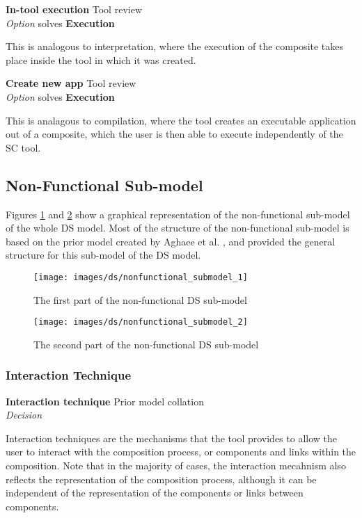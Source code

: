 \textbf{In-tool execution} \hfill Tool review \\ \emph{Option} \hfill solves \textbf{Execution}

This is analogous to interpretation, where the execution of the composite takes place inside the tool in which it was created.

\textbf{Create new app} \hfill Tool review \\ \emph{Option} \hfill solves \textbf{Execution}

This is analagous to compilation, where the tool creates an executable application out of a composite, which the user is then able to execute independently of the SC tool.

\subsection{Non-Functional Sub-model}

Figures \ref{ds:fig:nonfunctional1} and \ref{ds:fig:nonfunctional2} show a graphical representation of the non-functional sub-model of the whole DS model. Most of the structure of the non-functional sub-model is based on the prior model created by Aghaee et al. \cite{Aghaee2012}, and provided the general structure for this sub-model of the DS model.

\begin{figure}[htb]
	\centering
	\texttt{[image: images/ds/nonfunctional\_submodel\_1]}
	\caption{The first part of the non-functional DS sub-model}
	\label{ds:fig:nonfunctional1}
\end{figure}


\begin{figure}[htb]
	\centering
	\texttt{[image: images/ds/nonfunctional\_submodel\_2]}
	\caption{The second part of the non-functional DS sub-model}
	\label{ds:fig:nonfunctional2}
\end{figure}

\clearpage

\subsubsection{Interaction Technique}

\textbf{Interaction technique} \hfill Prior model collation \cite{Aghaee2012} \\ \emph{Decision} \hfill 

Interaction techniques are the mechanisms that the tool provides to allow the user to interact with the composition process, or components and links within the composition. Note that in the majority of cases, the interaction mecahnism also reflects the representation of the composition process, although it can be independent of the representation of the components or links between components.

